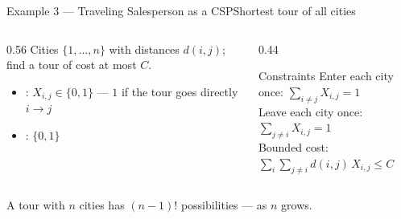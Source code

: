 \documentclass[aspectratio=169,11pt]{beamer}
\begin{document}
\begin{frame}{Example 3 — Traveling Salesperson as a CSP}{Shortest tour of all cities}
  \begin{columns}[T]
    \begin{column}{0.56\textwidth}
      Cities $\{1,\dots,n\}$ with distances $d(i,j)$; find a tour of cost at most $C$.
      \begin{itemize}\small
        \item {}: $X_{i,j}\in\{0,1\}$ — $1$ if the tour goes directly $i\to j$
        \item {}: $\{0,1\}$
      \end{itemize}
    \end{column}
    \begin{column}{0.44\textwidth}
      \begin{block}{Constraints}
        \footnotesize
        Enter each city once: $\displaystyle\sum_{i\neq j} X_{i,j}=1$ \\[0.4em]
        Leave each city once: $\displaystyle\sum_{j\neq i} X_{i,j}=1$ \\[0.4em]
        Bounded cost: $\displaystyle\sum_{i}\sum_{j\neq i} d(i,j)\,X_{i,j}\le C$
      \end{block}
    \end{column}
  \end{columns}
  \vspace{0.3em}
  \begin{center}\scriptsize
    A tour with $n$ cities has $(n-1)!$ possibilities —  as $n$ grows.
  \end{center}
\end{frame}
\end{document}
